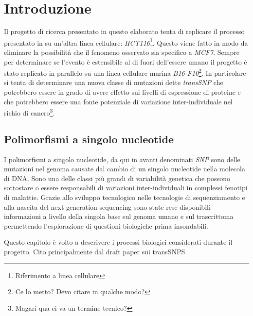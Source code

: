 \chapter{Introduzione}
\label{cha:intro}




Il progetto di ricerca presentato in questo elaborato tenta di replicare il processo presentato in \cite{transsnp} su un'altra linea cellulare: \emph{HCT116}\footnote{Riferimento a linea cellulare}.
Questo viene fatto in modo da eliminare la possibilit\`a che il fenomeno osservato sia specifico a \emph{MCF7}.
Sempre per determinare se l'evento \`e estensibile al di fuori dell'essere umano il progetto \`e stato replicato in parallelo su una linea cellulare murina \emph{B16-F10}\footnote{Ce lo metto? Devo citare in qualche modo?}.
In particolare si tenta di determinare una nuova classe di mutazioni dette \emph{transSNP} che potrebbero essere in grado di avere effetto sui livelli di espressione di proteine e che potrebbero essere una fonte potenziale di variazione inter-individuale nel richio di cancro\footnote{Magari qua ci va un termine tecnico?}.

\section{Polimorfismi a singolo nucleotide}
I polimorfismi a singolo nucleotide, da qui in avanti denominati \emph{SNP} sono delle mutazioni nel genoma causate dal cambio di un singolo nucleotide nella molecola di DNA.
Sono una delle classi pi\`u grandi di variabilit\`a genetica che possono sottostare o essere responsabili di variazioni inter-individuali in complessi fenotipi di malattie.
Grazie allo sviluppo tecnologico nelle tecnologie di sequenziamento e alla nascita del next-generation sequencing sono state rese disponibili informazioni a livello della singola base sul genoma umano e sul trascrittoma permettendo l'esplorazione di questioni biologiche prima insondabili.





Questo capitolo \`e volto a descrivere i processi biologici considerati durante il progetto.
Cito principalmente dal draft paper sui transSNPS


